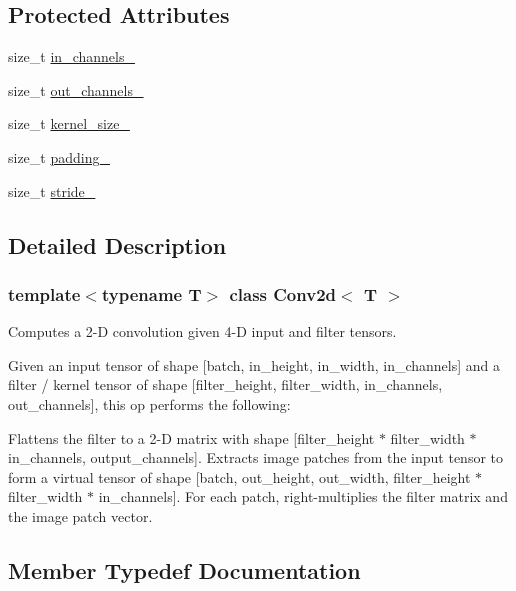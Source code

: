 \subsection*{Protected Attributes}
\begin{DoxyCompactItemize}
\item 
size\+\_\+t \mbox{\hyperlink{class_conv2d_afdb638e506f642d24a8d22fb8c2a821a}{in\+\_\+channels\+\_\+}}
\item 
size\+\_\+t \mbox{\hyperlink{class_conv2d_a48b99a4dee42c4d4221eddedccceffba}{out\+\_\+channels\+\_\+}}
\item 
size\+\_\+t \mbox{\hyperlink{class_conv2d_ad6447ab4000d593e8c4be9bb9c18f92b}{kernel\+\_\+size\+\_\+}}
\item 
size\+\_\+t \mbox{\hyperlink{class_conv2d_a8e548b8a5c0efaf494b819523951b558}{padding\+\_\+}}
\item 
size\+\_\+t \mbox{\hyperlink{class_conv2d_a95a69ad326bc6279247163d50f332b3d}{stride\+\_\+}}
\end{DoxyCompactItemize}


\subsection{Detailed Description}
\subsubsection*{template$<$typename T$>$\newline
class Conv2d$<$ T $>$}

Computes a 2-\/D convolution given 4-\/D input and filter tensors. 

Given an input tensor of shape \mbox{[}batch, in\+\_\+height, in\+\_\+width, in\+\_\+channels\mbox{]} and a filter / kernel tensor of shape \mbox{[}filter\+\_\+height, filter\+\_\+width, in\+\_\+channels, out\+\_\+channels\mbox{]}, this op performs the following\+:

Flattens the filter to a 2-\/D matrix with shape \mbox{[}filter\+\_\+height $\ast$ filter\+\_\+width $\ast$ in\+\_\+channels, output\+\_\+channels\mbox{]}. Extracts image patches from the input tensor to form a virtual tensor of shape \mbox{[}batch, out\+\_\+height, out\+\_\+width, filter\+\_\+height $\ast$ filter\+\_\+width $\ast$ in\+\_\+channels\mbox{]}. For each patch, right-\/multiplies the filter matrix and the image patch vector. 

\subsection{Member Typedef Documentation}
\mbox{\label{class_conv2d_a8263e2f2c46243e39fbca5712603c0fd}} 
